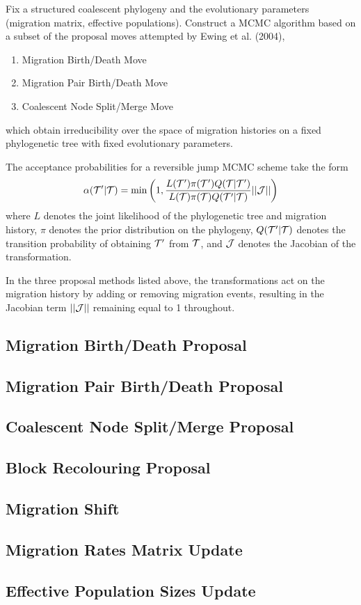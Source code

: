 Fix a structured coalescent phylogeny and the evolutionary parameters (migration matrix, effective populations). Construct a MCMC algorithm based on a subset of the proposal moves attempted by Ewing et al. (2004),
	\begin{enumerate}
		\item Migration Birth/Death Move
		\item Migration Pair Birth/Death Move
		\item Coalescent Node Split/Merge Move
	\end{enumerate}
which obtain irreducibility over the space of migration histories on a fixed phylogenetic tree with fixed evolutionary parameters.

The acceptance probabilities for a reversible jump MCMC scheme take the form
	\begin{equation}
		\alpha(\mathcal{T}' | \mathcal{T}) = \min \left( 1, \frac{L(\mathcal{T}') \pi(\mathcal{T}') Q(\mathcal{T} | \mathcal{T}')}{L(\mathcal{T}) \pi(\mathcal{T}) Q(\mathcal{T}' | \mathcal{T})} || \mathcal{J} || \right)
	\end{equation}
where $L$ denotes the joint likelihood of the phylogenetic tree and migration history, $\pi$ denotes the prior distribution on the phylogeny, $Q(\mathcal{T}' | \mathcal{T})$ denotes the transition probability of obtaining $\mathcal{T}'$ from $\mathcal{T}$, and $\mathcal{J}$ denotes the Jacobian of the transformation.

In the three proposal methods listed above, the transformations act on the migration history by adding or removing migration events, resulting in the Jacobian term $||\mathcal{J} ||$ remaining equal to 1 throughout.

\subsection{Migration Birth/Death Proposal}
	
	
\subsection{Migration Pair Birth/Death Proposal}
	
	
\subsection{Coalescent Node Split/Merge Proposal}
	
	
\subsection{Block Recolouring Proposal}
	
	
\subsection{Migration Shift}
	
	
\subsection{Migration Rates Matrix Update}
	
	
\subsection{Effective Population Sizes Update}
	